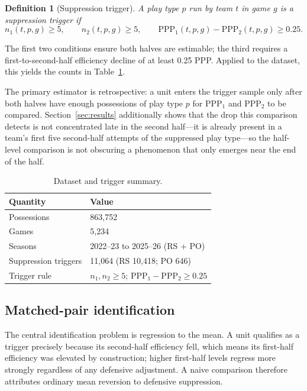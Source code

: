\documentclass[11pt]{article}
\newtheorem{definition}{Definition}
\begin{document}
\begin{definition}[Suppression trigger]
A play type $p$ run by team $t$ in game $g$ is a \emph{suppression trigger} if
\begin{equation}
n_1(t,p,g) \geq 5, \qquad
n_2(t,p,g) \geq 5, \qquad
\mathrm{PPP}_1(t,p,g) - \mathrm{PPP}_2(t,p,g) \geq 0.25 .
\end{equation}
\end{definition}

The first two conditions ensure both halves are estimable; the third requires a first-to-second-half efficiency decline of at least 0.25 PPP. Applied to the dataset, this yields the counts in Table~\ref{tab:dataset}.

The primary estimator is retrospective: a unit enters the trigger sample only after both halves have enough possessions of play type $p$ for $\mathrm{PPP}_1$ and $\mathrm{PPP}_2$ to be compared. Section~\ref{sec:results} additionally shows that the drop this comparison detects is not concentrated late in the second half---it is already present in a team's first five second-half attempts of the suppressed play type---so the half-level comparison is not obscuring a phenomenon that only emerges near the end of the half.

\begin{table}[t]
\centering
\caption{Dataset and trigger summary.}
\label{tab:dataset}
\begin{tabular}{ll}
\toprule
Quantity & Value \\
\midrule
Possessions & 863,752 \\
Games & 5,234 \\
Seasons & 2022--23 to 2025--26 (RS + PO) \\
Suppression triggers & 11,064 (RS 10,418; PO 646) \\
Trigger rule & $n_1, n_2 \geq 5$; $\mathrm{PPP}_1 - \mathrm{PPP}_2 \geq 0.25$ \\
\bottomrule
\end{tabular}
\end{table}

\subsection{Matched-pair identification}

The central identification problem is regression to the mean. A unit qualifies as a trigger precisely because its second-half efficiency fell, which means its first-half efficiency was elevated by construction; higher first-half levels regress more strongly regardless of any defensive adjustment. A naive comparison therefore attributes ordinary mean reversion to defensive suppression.
\end{document}
